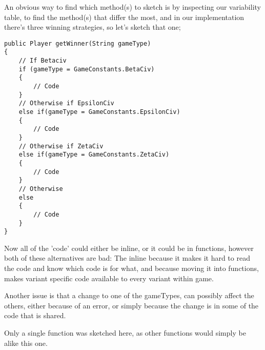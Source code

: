An obvious way to find which method(s) to sketch is by inspecting our
variability table, to find the method(s) that differ the most, and in our
implementation there's three winning strategies, so let's sketch that one;

\begin{lstlisting}
public Player getWinner(String gameType)
{
    // If Betaciv
    if (gameType = GameConstants.BetaCiv)
    {
        // Code
    }
    // Otherwise if EpsilonCiv
    else if(gameType = GameConstants.EpsilonCiv)
    {
        // Code
    }
    // Otherwise if ZetaCiv
    else if(gameType = GameConstants.ZetaCiv)
    {
        // Code
    }
    // Otherwise
    else
    {
        // Code
    }
}
\end{lstlisting}

Now all of the 'code' could either be inline, or it could be in functions,
however both of these alternatives are bad: 
The inline because it makes it hard to read the code and know which code is
for what, and because moving it into functions, makes variant specific code
available to every variant within game.

Another issue is that a change to one of the gameTypes, can possibly affect the
others, either because of an error, or simply because the change is in some of
the code that is shared.

Only a single function was sketched here, as other functions would simply be
alike this one.
